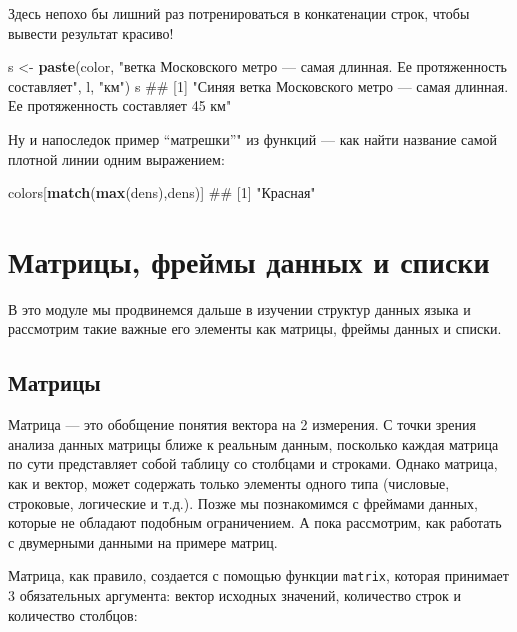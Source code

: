\documentclass[]{book}
\newenvironment{Shaded}{\begin{snugshade}}{\end{snugshade}}
\newcommand{\KeywordTok}[1]{\textcolor[rgb]{0.13,0.29,0.53}{\textbf{#1}}}
\newcommand{\StringTok}[1]{\textcolor[rgb]{0.31,0.60,0.02}{#1}}
\newcommand{\NormalTok}[1]{#1}
\begin{document}
Здесь непохо бы лишний раз потренироваться в конкатенации строк, чтобы
вывести результат красиво!

\begin{Shaded}
\begin{Highlighting}[]
\NormalTok{s <-}\StringTok{ }\KeywordTok{paste}\NormalTok{(color, }\StringTok{"ветка Московского метро — самая длинная. Ее протяженность составляет"}\NormalTok{, l, }\StringTok{"км"}\NormalTok{)}
\NormalTok{s}
\NormalTok{## [1] "Синяя ветка Московского метро — самая длинная. Ее протяженность составляет 45 км"}
\end{Highlighting}
\end{Shaded}

Ну и напоследок пример ``матрешки''" из функций --- как найти название
самой плотной линии одним выражением:

\begin{Shaded}
\begin{Highlighting}[]
\NormalTok{colors[}\KeywordTok{match}\NormalTok{(}\KeywordTok{max}\NormalTok{(dens),dens)]}
\NormalTok{## [1] "Красная"}
\end{Highlighting}
\end{Shaded}

\chapter{Матрицы, фреймы данных и списки}\label{matrix_dataframes}

В это модуле мы продвинемся дальше в изучении структур данных языка и
рассмотрим такие важные его элементы как матрицы, фреймы данных и
списки.

\section{Матрицы}

Матрица --- это обобщение понятия вектора на 2 измерения. С точки зрения
анализа данных матрицы ближе к реальным данным, посколько каждая матрица
по сути представляет собой таблицу со столбцами и строками. Однако
матрица, как и вектор, может содержать только элементы одного типа
(числовые, строковые, логические и т.д.). Позже мы познакомимся с
фреймами данных, которые не обладают подобным ограничением. А пока
рассмотрим, как работать с двумерными данными на примере матриц.

Матрица, как правило, создается с помощью функции \texttt{matrix},
которая принимает 3 обязательных аргумента: вектор исходных значений,
количество строк и количество столбцов:
\end{document}
